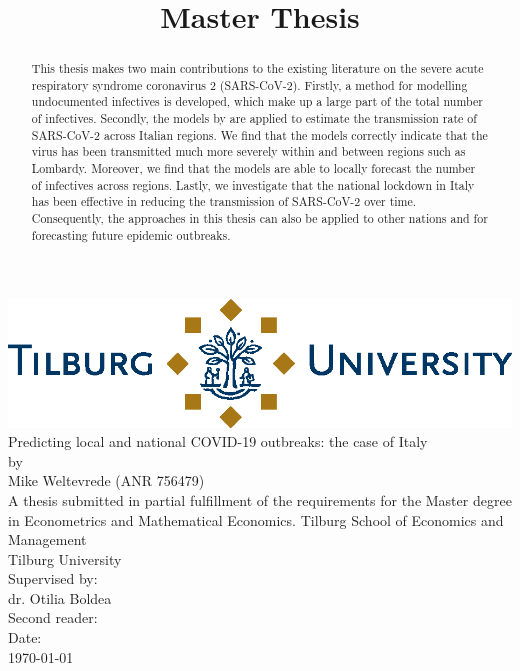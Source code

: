 \documentclass[12pt]{article}
\title{Master Thesis}
\newcommand\blankpage{
	\null
	\thispagestyle{empty}
	\addtocounter{page}{-1}
	\newpage}
\begin{document}
	
	\afterpage{\blankpage}
	
	\begin{titlepage}
		\centering
		
		\vfill
		
		\includegraphics[width=0.94\linewidth]{output/TiuLogo.eps}
		\vskip1.5cm
		{\huge
			Predicting local and national COVID-19 outbreaks: the case of Italy \\
			\large\bigskip
			by\\
			Mike Weltevrede (ANR 756479)\\
			\vskip1.5cm
			A thesis submitted in partial fulfillment of the requirements for the Master degree in Econometrics and Mathematical Economics.
			\vskip0.5cm
			Tilburg School of Economics and Management\\
			Tilburg University\\
			\vskip1.5cm
			Supervised by:\\
			dr. Otilia Boldea \\
			\vskip0.5cm
			Second reader:\\
			\vfill
			Date:\\
			\today
		}   
		\vfill
		\vfill
	\end{titlepage}
	
	\newpage
	
	\newpage
	
	\begin{abstract}
		This thesis makes two main contributions to the existing literature on the severe acute respiratory syndrome coronavirus 2 (SARS-CoV-2). Firstly, a method for modelling undocumented infectives is developed, which \textcite{li2020undocumented} make up a large part of the total number of infectives. Secondly, the models by \textcite{adda2016economic} are applied to estimate the transmission rate of SARS-CoV-2 across Italian regions. We find that the models correctly indicate that the virus has been transmitted much more severely within and between regions such as Lombardy. Moreover, we find that the models are able to locally forecast the number of infectives across regions. Lastly, we investigate that the national lockdown in Italy has been effective in reducing the transmission of SARS-CoV-2 over time. Consequently, the approaches in this thesis can also be applied to other nations and for forecasting future epidemic outbreaks.
		
		
	\end{abstract}
	
\end{document}
